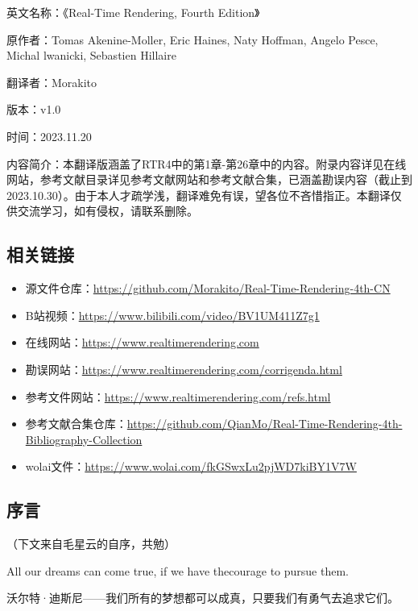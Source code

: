 \documentclass[
  paper=a4,
  ,captions=tableheading
]{scrartcl}
\providecommand{\tightlist}{%
  \setlength{\itemsep}{0pt}\setlength{\parskip}{0pt}}
\renewenvironment{quote}{\begin{customblockquote}\list{}{\rightmargin=0em\leftmargin=0em}%
\item\relax\color{blockquote-text}\ignorespaces}{\unskip\unskip\endlist\end{customblockquote}}
\begin{document}
英文名称：《Real-Time Rendering, Fourth Edition》

原作者：Tomas Akenine-Moller, Eric Haines, Naty Hoffman, Angelo Pesce,
Michal lwanicki, Sebastien Hillaire

翻译者：Morakito

版本：v1.0

时间：2023.11.20

内容简介：本翻译版涵盖了RTR4中的第1章-第26章中的内容。附录内容详见在线网站，参考文献目录详见参考文献网站和参考文献合集，已涵盖勘误内容（截止到2023.10.30）。由于本人才疏学浅，翻译难免有误，望各位不吝惜指正。本翻译仅供交流学习，如有侵权，请联系删除。

\subsection{相关链接}\label{ux76f8ux5173ux94feux63a5}

\begin{itemize}
\tightlist
\item
  源文件仓库：\url{https://github.com/Morakito/Real-Time-Rendering-4th-CN}
\item
  B站视频：\url{https://www.bilibili.com/video/BV1UM411Z7g1}
\item
  在线网站：\href{https://www.realtimerendering.com/}{https://www.realtimerendering.com}
\item
  勘误网站：\url{https://www.realtimerendering.com/corrigenda.html}
\item
  参考文件网站：\url{https://www.realtimerendering.com/refs.html}
\item
  参考文献合集仓库：\url{https://github.com/QianMo/Real-Time-Rendering-4th-Bibliography-Collection}
\item
  wolai文件：\url{https://www.wolai.com/fkGSwxLu2pjWD7kiBY1V7W}
\end{itemize}

\subsection{序言}\label{ux5e8fux8a00}

（下文来自毛星云的自序，共勉）

\begin{quote}
All our dreams can come true, if we have thecourage to pursue them.
\end{quote}

\begin{quote}
沃尔特·迪斯尼------我们所有的梦想都可以成真，只要我们有勇气去追求它们。 
\end{quote}
\end{document}
